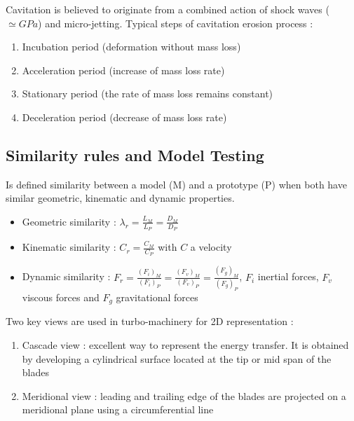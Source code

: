 \documentclass[../main.tex]{subfiles}
\begin{document}
Cavitation is believed to originate from a combined action of shock waves ($\simeq GPa$) and micro-jetting. 
Typical steps of cavitation erosion process : \begin{enumerate}
    \item Incubation period (deformation without mass loss)
    \item Acceleration period (increase of mass loss rate)
    \item Stationary period (the rate of mass loss remains constant)
    \item Deceleration period (decrease of mass loss rate)
\end{enumerate}

\subsection{Similarity rules and Model Testing}
Is defined similarity between a model (M) and a prototype (P) when both have similar geometric, kinematic and dynamic properties. \begin{itemize}
    \item Geometric similarity : $\lambda_r = \frac{L_M}{L_P} = \frac{D_M}{D_P}$
    \item Kinematic similarity : $C_r = \frac{C_M}{C_P}$ with $C$ a velocity
    \item Dynamic similarity : $F_r = \frac{(F_i)_M}{(F_i)_P} = \frac{(F_v)_M}{(F_v)_P} = \frac{(F_g)_M}{(F_g)_P}$, $F_i$ inertial forces, $F_v$ viscous forces and $F_g$ gravitational forces
\end{itemize}

Two key views are used in turbo-machinery for 2D representation : \begin{enumerate}
    \item Cascade view : excellent way to represent the energy transfer. It is obtained by developing a cylindrical surface located at the tip or mid span of the blades
    \item Meridional view : leading and trailing edge of the blades are projected on a meridional plane using a circumferential line
\end{enumerate}
\end{document}
